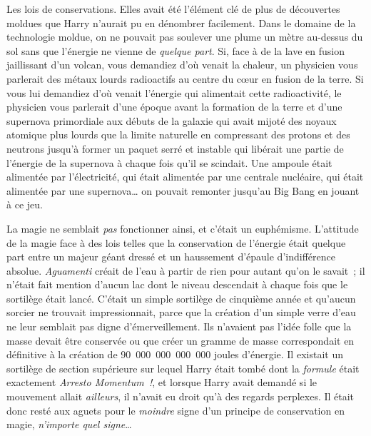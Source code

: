 Les lois de conservations. Elles avait été l'élément clé de plus de découvertes moldues que Harry n'aurait pu en dénombrer facilement. Dans le domaine de la technologie moldue, on ne pouvait pas soulever une plume un mètre au-dessus du sol sans que l'énergie ne vienne de \emph{quelque part}. Si, face à de la lave en fusion jaillissant d'un volcan, vous demandiez d'où venait la chaleur, un physicien vous parlerait des métaux lourds radioactifs au centre du cœur en fusion de la terre. Si vous lui demandiez d'où venait l'énergie qui alimentait cette radioactivité, le physicien vous parlerait d'une époque avant la formation de la terre et d'une supernova primordiale aux débuts de la galaxie qui avait mijoté des noyaux atomique plus lourds que la limite naturelle en compressant des protons et des neutrons jusqu'à former un paquet serré et instable qui libérait une partie de l'énergie de la supernova à chaque fois qu'il se scindait. Une ampoule était alimentée par l'électricité, qui était alimentée par une centrale nucléaire, qui était alimentée par une supernova… on pouvait remonter jusqu'au Big Bang en jouant à ce jeu.

La magie ne semblait \emph{pas} fonctionner ainsi, et c'était un euphémisme. L'attitude de la magie face à des lois telles que la conservation de l'énergie était quelque part entre un majeur géant dressé et un haussement d'épaule d'indifférence absolue. \emph{Aguamenti} créait de l'eau à partir de rien pour autant qu'on le savait~; il n'était fait mention d'aucun lac dont le niveau descendait à chaque fois que le sortilège était lancé. C'était un simple sortilège de cinquième année et qu'aucun sorcier ne trouvait impressionnait, parce que la création d'un simple verre d'eau ne leur semblait pas digne d'émerveillement. Ils n'avaient pas l'idée folle que la masse devait être conservée ou que créer un gramme de masse correspondait en définitive à la création de 90~000~000~000~000 joules d'énergie. Il existait un sortilège de section supérieure sur lequel Harry était tombé dont la \emph{formule} était exactement \emph{Arresto Momentum~!}, et lorsque Harry avait demandé si le mouvement allait \emph{ailleurs}, il n'avait eu droit qu'à des regards perplexes. Il était donc resté aux aguets pour le \emph{moindre} signe d'un principe de conservation en magie, \emph{n'importe quel signe}…

